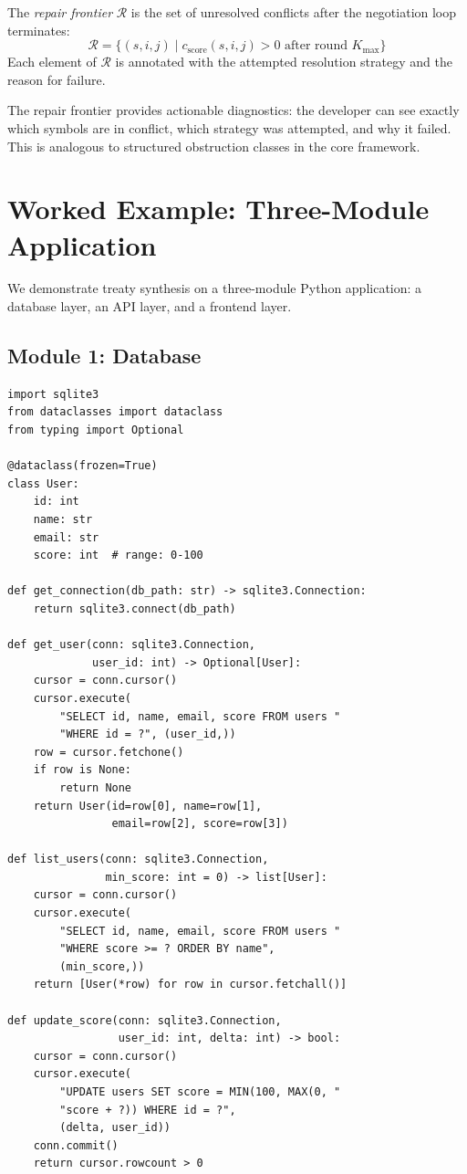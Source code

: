 \documentclass[11pt]{article}
\newcommand{\cscore}[1][]{c_{\mathrm{score}#1}}
\begin{document}
\begin{definition}\label{def:repair}
The \emph{repair frontier} $\mathcal{R}$ is the set of unresolved
conflicts after the negotiation loop terminates:
\[
  \mathcal{R} = \{(s, i, j) \mid \cscore(s, i, j) > 0
    \text{ after round } K_{\max}\}
\]
Each element of $\mathcal{R}$ is annotated with the attempted
resolution strategy and the reason for failure.
\end{definition}

The repair frontier provides actionable diagnostics: the developer
can see exactly which symbols are in conflict, which strategy was
attempted, and why it failed.  This is analogous to structured
obstruction classes in the core \JuGeo{} framework.

\section{Worked Example: Three-Module Application}\label{sec:worked-example}

We demonstrate treaty synthesis on a three-module Python application:
a database layer, an API layer, and a frontend layer.

\subsection{Module 1: Database}

\begin{lstlisting}[style=jugeo-python,caption={Database module (db.py).}]
import sqlite3
from dataclasses import dataclass
from typing import Optional

@dataclass(frozen=True)
class User:
    id: int
    name: str
    email: str
    score: int  # range: 0-100

def get_connection(db_path: str) -> sqlite3.Connection:
    return sqlite3.connect(db_path)

def get_user(conn: sqlite3.Connection,
             user_id: int) -> Optional[User]:
    cursor = conn.cursor()
    cursor.execute(
        "SELECT id, name, email, score FROM users "
        "WHERE id = ?", (user_id,))
    row = cursor.fetchone()
    if row is None:
        return None
    return User(id=row[0], name=row[1],
                email=row[2], score=row[3])

def list_users(conn: sqlite3.Connection,
               min_score: int = 0) -> list[User]:
    cursor = conn.cursor()
    cursor.execute(
        "SELECT id, name, email, score FROM users "
        "WHERE score >= ? ORDER BY name",
        (min_score,))
    return [User(*row) for row in cursor.fetchall()]

def update_score(conn: sqlite3.Connection,
                 user_id: int, delta: int) -> bool:
    cursor = conn.cursor()
    cursor.execute(
        "UPDATE users SET score = MIN(100, MAX(0, "
        "score + ?)) WHERE id = ?",
        (delta, user_id))
    conn.commit()
    return cursor.rowcount > 0
\end{lstlisting}
\end{document}

